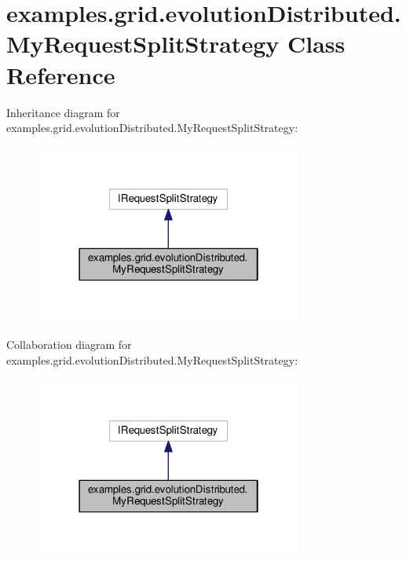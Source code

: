 \hypertarget{classexamples_1_1grid_1_1evolution_distributed_1_1_my_request_split_strategy}{\section{examples.\-grid.\-evolution\-Distributed.\-My\-Request\-Split\-Strategy Class Reference}
\label{classexamples_1_1grid_1_1evolution_distributed_1_1_my_request_split_strategy}
}


Inheritance diagram for examples.\-grid.\-evolution\-Distributed.\-My\-Request\-Split\-Strategy\-:
\nopagebreak
\begin{figure}[H]
\begin{center}
\leavevmode
\includegraphics[width=250pt]{classexamples_1_1grid_1_1evolution_distributed_1_1_my_request_split_strategy__inherit__graph}
\end{center}
\end{figure}


Collaboration diagram for examples.\-grid.\-evolution\-Distributed.\-My\-Request\-Split\-Strategy\-:
\nopagebreak
\begin{figure}[H]
\begin{center}
\leavevmode
\includegraphics[width=250pt]{classexamples_1_1grid_1_1evolution_distributed_1_1_my_request_split_strategy__coll__graph}
\end{center}
\end{figure}
